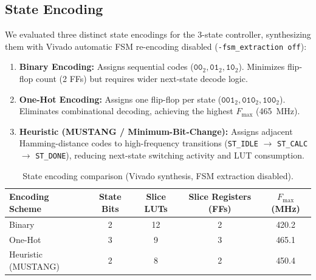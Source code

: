 \documentclass[11pt,a4paper]{article}
\begin{document}
\subsection{State Encoding}
We evaluated three distinct state encodings for the 3-state controller, synthesizing them with Vivado automatic FSM re-encoding disabled (\texttt{-fsm\_extraction off}):
\begin{enumerate}
  \item \textbf{Binary Encoding:} Assigns sequential codes ($\texttt{00}_2, \texttt{01}_2, \texttt{10}_2$). Minimizes flip-flop count (2 FFs) but requires wider next-state decode logic.
  \item \textbf{One-Hot Encoding:} Assigns one flip-flop per state ($\texttt{001}_2, \texttt{010}_2, \texttt{100}_2$). Eliminates combinational decoding, achieving the highest $F_{\text{max}}$ (465~MHz).
  \item \textbf{Heuristic (MUSTANG / Minimum-Bit-Change):} Assigns adjacent Hamming-distance codes to high-frequency transitions (\texttt{ST\_IDLE} $\to$ \texttt{ST\_CALC} $\to$ \texttt{ST\_DONE}), reducing next-state switching activity and LUT consumption.
\end{enumerate}

\begin{table}[H]\centering\small
\caption{State encoding comparison (Vivado synthesis, FSM extraction disabled).}\label{tab:encoding}
\begin{tabular}{@{}lcccc@{}}
\toprule
Encoding Scheme & State Bits & Slice LUTs & Slice Registers (FFs) & $F_{\text{max}}$ (MHz)\\
\midrule
Binary               & 2 & 12 & 2 & 420.2\\
One-Hot              & 3 & 9  & 3 & 465.1\\
Heuristic (MUSTANG)  & 2 & 8  & 2 & 450.4\\
\bottomrule
\end{tabular}
\end{table}
\end{document}

